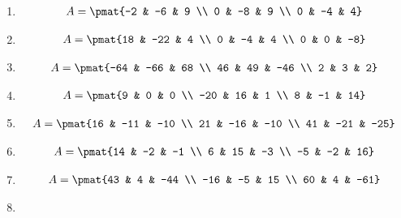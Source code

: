 \begin{enumerate}
\item

\begin{align*}
A = \pmat{-2 & -6 & 9 \\ 0 & -8 & 9 \\ 0 & -4 & 4}
\end{align*}

\item

\begin{align*}
A = \pmat{18 & -22 & 4 \\ 0 & -4 & 4 \\ 0 & 0 & -8}
\end{align*}

\item

\begin{align*}
A = \pmat{-64 & -66 & 68 \\ 46 & 49 & -46 \\ 2 & 3 & 2}
\end{align*}

\item

\begin{align*}
A = \pmat{9 & 0 & 0 \\ -20 & 16 & 1 \\ 8 & -1 & 14}
\end{align*}

\item

\begin{align*}
A = \pmat{16 & -11 & -10 \\ 21 & -16 & -10 \\ 41 & -21 & -25}
\end{align*}

\item

\begin{align*}
A = \pmat{14 & -2 & -1 \\ 6 & 15 & -3 \\ -5 & -2 & 16}
\end{align*}

\item

\begin{align*}
A = \pmat{43 & 4 & -44 \\ -16 & -5 & 15 \\ 60 & 4 & -61}
\end{align*}

\item


\end{enumerate}
